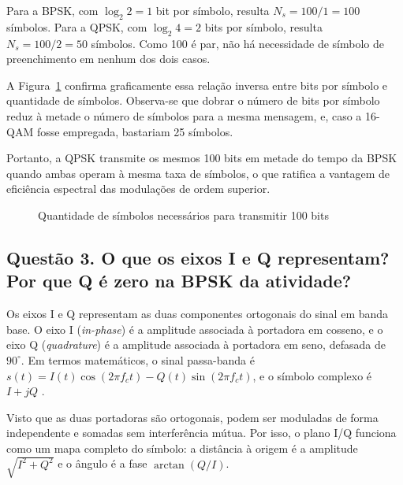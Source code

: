 Para a BPSK, com $\log_2 2 = 1$ bit por símbolo, resulta $N_s = 100/1 = 100$ símbolos. Para a QPSK, com $\log_2 4 = 2$ bits por símbolo, resulta $N_s = 100/2 = 50$ símbolos. Como 100 é par, não há necessidade de símbolo de preenchimento em nenhum dos dois casos.

A Figura~\ref{fig:q2} confirma graficamente essa relação inversa entre bits por símbolo e quantidade de símbolos. Observa-se que dobrar o número de bits por símbolo reduz à metade o número de símbolos para a mesma mensagem, e, caso a 16-QAM fosse empregada, bastariam 25 símbolos.

Portanto, a QPSK transmite os mesmos 100 bits em metade do tempo da BPSK quando ambas operam à mesma taxa de símbolos, o que ratifica a vantagem de eficiência espectral das modulações de ordem superior.

\begin{figure}[H]
\centering
{}
\caption{Quantidade de símbolos necessários para transmitir 100 bits}\label{fig:q2}
\end{figure}

\subsection*{Questão 3. O que os eixos I e Q representam? Por que Q é zero na BPSK da atividade?}

Os eixos I e Q representam as duas componentes ortogonais do sinal em banda base. O eixo I (\textit{in-phase}) é a amplitude associada à portadora em cosseno, e o eixo Q (\textit{quadrature}) é a amplitude associada à portadora em seno, defasada de $90^\circ$. Em termos matemáticos, o sinal passa-banda é $s(t)=I(t)\cos(2\pi f_c t)-Q(t)\sin(2\pi f_c t)$, e o símbolo complexo é $I+jQ$ \cite{haykin2008}.

Visto que as duas portadoras são ortogonais, podem ser moduladas de forma independente e somadas sem interferência mútua. Por isso, o plano I/Q funciona como um mapa completo do símbolo: a distância à origem é a amplitude $\sqrt{I^2+Q^2}$ e o ângulo é a fase $\arctan(Q/I)$.

